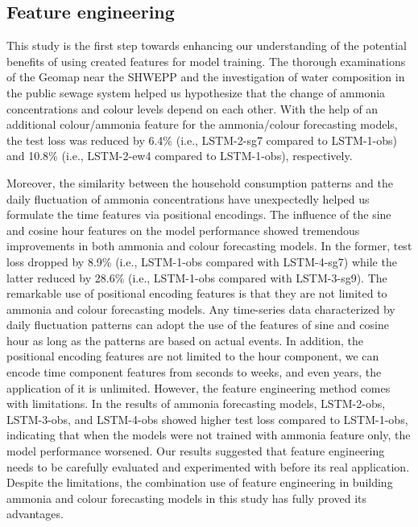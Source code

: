 
\subsection{Feature engineering}
This study is the first step towards enhancing our understanding of the potential benefits of using created features for model training. The thorough examinations of the Geomap near the SHWEPP and the investigation of water composition in the public sewage system helped us hypothesize that the change of ammonia concentrations and colour levels depend on each other. With the help of an additional colour/ammonia feature for the ammonia/colour forecasting models, the test loss was reduced by 6.4\% (i.e., LSTM-2-sg7 compared to LSTM-1-obs) and 10.8\% (i.e., LSTM-2-ew4 compared to LSTM-1-obs), respectively.

Moreover, the similarity between the household consumption patterns and the daily fluctuation of ammonia concentrations have unexpectedly helped us formulate the time features via positional encodings. The influence of the sine and cosine hour features on the model performance showed tremendous improvements in both ammonia and colour forecasting models. In the former, test loss dropped by 8.9\% (i.e., LSTM-1-obs compared with LSTM-4-sg7) while the latter reduced by 28.6\% (i.e., LSTM-1-obs compared with LSTM-3-sg9). The remarkable use of positional encoding features is that they are not limited to ammonia and colour forecasting models. Any time-series data characterized by daily fluctuation patterns can adopt the use of the features of sine and cosine hour as long as the patterns are based on actual events. In addition, the positional encoding features are not limited to the hour component, we can encode time component features from seconds to weeks, and even years, the application of it is unlimited. However, the feature engineering method comes with limitations. In the results of ammonia forecasting models, LSTM-2-obs, LSTM-3-obs, and LSTM-4-obs showed higher test loss compared to LSTM-1-obs, indicating that when the models were not trained with ammonia feature only, the model performance worsened. Our results suggested that feature engineering needs to be carefully evaluated and experimented with before its real application. Despite the limitations, the combination use of feature engineering in building ammonia and colour forecasting models in this study has fully proved its advantages.

